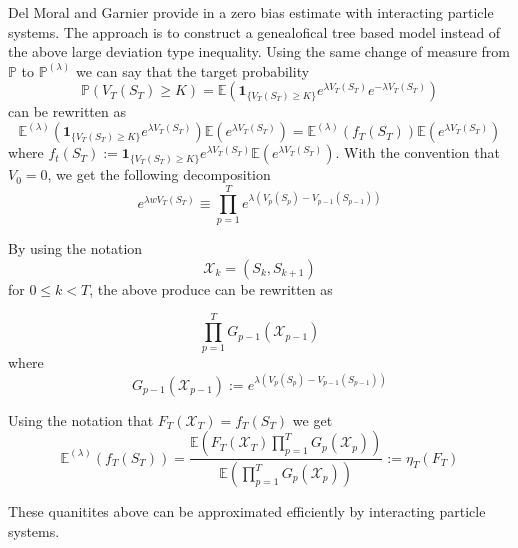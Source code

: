 Del Moral and Garnier provide in \cite{delmoral2005} a zero bias estimate with interacting particle systems. The approach is to construct a genealofical tree based model instead of the above large deviation type inequality.
Using the same change of measure from $\mathbb{P}$ to $\mathbb{P}^{(\lambda)}$ we can say that the target probability
$$\mathbb{P}(V_T(S_T) \geq K) = \mathbb{E}\left( \mathbf{1}_{\{V_T(S_T) \geq K\}}e^{\lambda V_T(S_T)}e^{-\lambda V_T(S_T)} \right)$$
can be rewritten as
$$\mathbb{E}^{(\lambda)} \left(  \mathbf{1}_{\{V_T(S_T) \geq K\}} e^{\lambda V_T(S_T)} \right) \mathbb{E} \left(e^{\lambda V_T(S_T)}\right) = 
\mathbb{E}^{(\lambda)}(f_T(S_T)) \mathbb{E}(e^{\lambda V_T(S_T)})  $$
where $f_t(S_T) := \mathbf{1}_{\{V_T(S_T) \geq K\}}e^{\lambda V_T(S_T)} \mathbb{E}\left(e^{\lambda V_T(S_T)}\right) $. With the convention that $V_0 = 0$, we get the following decomposition
$$e^{\lambda w V_T(S_T)} \equiv \prod_{p=1}^{T} e^{\lambda (V_p(S_p) - V_{p-1}(S_{p-1}))}$$

By using the notation $$\mathcal{X}_k = (S_k, S_{k+1})$$ for $0 \leq k < T$, the above produce can be rewritten as

$$\prod_{p=1}^{T} G_{p-1}(\mathcal{X}_{p-1})$$ where
$$G_{p-1}(\mathcal{X}_{p-1}) := e^{\lambda (V_p(S_p) - V_{p-1}(S_{p-1}))}$$

Using the notation that $F_T(\mathcal{X}_T) = f_T(S_T)$ we get
\begin{equation}
	\mathbb{E}^{(\lambda)}(f_T(S_T)) = \frac{\mathbb{E}(F_T(\mathcal{X}_T)\prod_{p=1}^{T}G_p(\mathcal{X}_p))}{\mathbb{E}(\prod_{p=1}^{T}G_p(\mathcal{X}_p))} := \eta_T(F_T)
\end{equation}

These quanitites above can be approximated efficiently by interacting particle systems.

